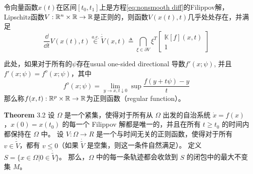 \begin{theorem}
    \cite{shevitzLyapunovStabilityTheory1994}
    令向量函数$x(t)$在区间$[t_0,t_1]$上是方程\eqref{eq:nonsmooth diff}的Filippov解，Lipschitz函数$V:\mathbb{R}^n\times \mathbb{R} \to \mathbb{R}$是正则的，则函数$V(x(t),t)$几乎处处存在，并满足 
    \begin{equation}
        \frac{\dd }{\dd t} V(x(t),t)\overset{a.e.}{\in} \dot{\tilde{V}}(x,t)\triangleq
        \bigcap_{\xi \in \partial V}
        \xi^T \begin{bmatrix}
            \mathbb{K}[f](x,t)
            \\1
        \end{bmatrix}
    \end{equation}
\end{theorem}
此处，如果对于所有的$\psi$存在usual one-sided directional 导数$f'(x;\psi)$, 并且$f'(x;\psi)=f^o(x;\psi)$，其中
\begin{equation*}
    f^o(x;\psi)=\lim_{y\to x,t\downarrow 0 }\sup \frac{f(y+t\psi)-y}{t}
\end{equation*}
那么称$f(x,t):\mathbb{R}^p \times \mathbb{R}\to \mathbb{R}$为正则函数（regular function）。

\begin{theorem}[非光滑系统LaSalle定理]\label{thm:LaSalle}
    \cite{shevitzLyapunovStabilityTheory1994} \textbf{Theorem} 3.2
    设 $\Omega$ 是一个紧集，使得对于所有从 $\Omega$ 出发的自治系统 $\dot{x} = f(x)$，$x(0) = x(t_0)$ 的每一个 Filippov 解都是唯一的，并且在所有 $t \geq t_0$ 的时间内都保持在 $\Omega$ 中。
    设 $V: \Omega \to R$ 是一个与时间无关的正则函数，使得对于所有 $v \in \dot{\tilde{V}}$，都有 $v \leq 0$（如果 $\dot{\tilde{V}}$ 是空集，则这一条件自然满足）。
    定义 $S = \{x \in \Omega | 0 \in \dot{\tilde{V}}\}$。
    那么，$\Omega$ 中的每一条轨迹都会收敛到 $S$ 的闭包中的最大不变集 $M$。
\end{theorem}

